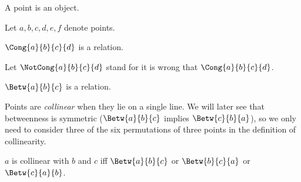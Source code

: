 \documentclass[10pt,a4paper,parskip=half,numbers=endperiod,parskip]{scrartcl}
\begin{document}
\begin{comment}
  \begin{forthel}
    [synonym point/-s]
  \end{forthel}
\end{comment}

  \begin{forthel}
    \begin{signature}
      A point is an object.
    \end{signature}
  \end{forthel}

  \begin{convention}
    \begin{forthel}
      Let $a, b, c, d, e, f$ denote points.
    \end{forthel}
  \end{convention}

  \begin{forthel}
    \begin{signature}[Congruence]
      $\Cong{a}{b}{c}{d}$ is a relation.
    \end{signature}
  \end{forthel}

  \begin{convention}
    \begin{forthel}
      Let $\NotCong{a}{b}{c}{d}$ stand for it is wrong that $\Cong{a}{b}{c}{d}$.
    \end{forthel}
  \end{convention}

  \begin{forthel}
    \begin{signature}[Betweenness]
      $\Betw{a}{b}{c}$ is a relation.
    \end{signature}
  \end{forthel}

  Points are \textit{collinear} when they lie on a single line.
  We will later see that betweenness is symmetric
  ($\Betw{a}{b}{c}$ implies $\Betw{c}{b}{a}$),
  so we only need to consider three of the six permutations of three points in the definition of collinearity.

  \begin{forthel}
    \begin{definition}[Collinearity]
      $a$ is collinear with $b$ and $c$ iff $\Betw{a}{b}{c}$ or $\Betw{b}{c}{a}$ or $\Betw{c}{a}{b}$.
    \end{definition}
  \end{forthel}
\end{document}
